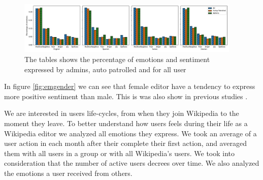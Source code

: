 \begin{figure}[H]
    \centering
    \includegraphics[width=0.95\textwidth]{./img/emroles.jpg}
    \caption{ The tables shows the percentage of emotions and sentiment expressed by admins, auto patrolled and for all user }
    \label{fig:emroles}
\end{figure}

In figure \ref{fig:emgender} we can see that female editor have a tendency to express more positive sentiment than male. This is was also show in previous studies \cite{laniado2012emotions} \cite{iosub2014emotions}.

We are interested in users life-cycles, from when they join Wikipedia to the moment they leave. To better understand how users feels during their life as a Wikipedia editor we analyzed all emotions they express. We took an average of a user action in each month after their complete their first action, and averaged them with all users in a group or with all Wikipedia's users. We took into consideration that the number of active users decrees over time. We also analyzed the emotions a user received from others.


